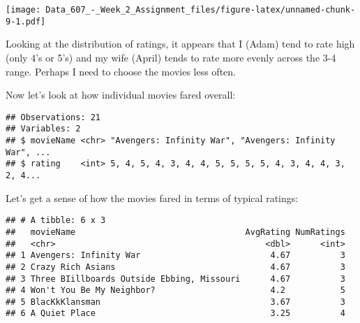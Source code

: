 \documentclass[]{article}
\newenvironment{Shaded}{\begin{snugshade}}{\end{snugshade}}
\newcommand{\KeywordTok}[1]{\textcolor[rgb]{0.13,0.29,0.53}{\textbf{#1}}}
\newcommand{\DataTypeTok}[1]{\textcolor[rgb]{0.13,0.29,0.53}{#1}}
\newcommand{\StringTok}[1]{\textcolor[rgb]{0.31,0.60,0.02}{#1}}
\newcommand{\CommentTok}[1]{\textcolor[rgb]{0.56,0.35,0.01}{\textit{#1}}}
\newcommand{\OperatorTok}[1]{\textcolor[rgb]{0.81,0.36,0.00}{\textbf{#1}}}
\newcommand{\NormalTok}[1]{#1}
\begin{document}
\texttt{[image: Data\_607\_-\_Week\_2\_Assignment\_files/figure-latex/unnamed-chunk-9-1.pdf]}

Looking at the distribution of ratings, it appears that I (Adam) tend to
rate high (only 4's or 5's) and my wife (April) tends to rate more
evenly across the 3-4 range. Perhaps I need to choose the movies less
often.

Now let's look at how individual movies fared overall:

\begin{Shaded}
\end{Shaded}

\begin{verbatim}
## Observations: 21
## Variables: 2
## $ movieName <chr> "Avengers: Infinity War", "Avengers: Infinity War", ...
## $ rating    <int> 5, 4, 5, 4, 3, 4, 4, 5, 5, 5, 5, 4, 3, 4, 4, 3, 2, 4...
\end{verbatim}

Let's get a sense of how the movies fared in terms of typical ratings:

\begin{Shaded}
\end{Shaded}

\begin{verbatim}
## # A tibble: 6 x 3
##   movieName                                  AvgRating NumRatings
##   <chr>                                          <dbl>      <int>
## 1 Avengers: Infinity War                          4.67          3
## 2 Crazy Rich Asians                               4.67          3
## 3 Three BIillboards Outside Ebbing, Missouri      4.67          3
## 4 Won't You Be My Neighbor?                       4.2           5
## 5 BlacKkKlansman                                  3.67          3
## 6 A Quiet Place                                   3.25          4
\end{verbatim}
\end{document}
